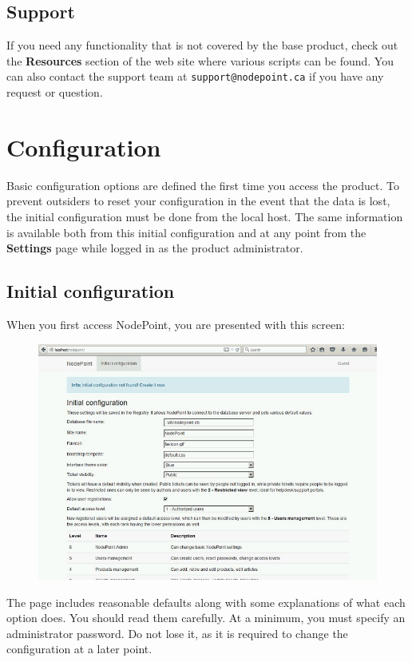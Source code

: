 \documentclass[11pt]{article}
\begin{document}
\subsection{Support}
If you need any functionality that is not covered by the base product, check out the \textbf{Resources} section of the web site where various scripts can be found. You can also contact the support team at \texttt{support@nodepoint.ca} if you have any request or question.

\clearpage
\section{Configuration}
Basic configuration options are defined the first time you access the product. To prevent outsiders to reset your configuration in the event that the data is lost, the initial configuration must be done from the local host. The same information is available both from this initial configuration and at any point from the \textbf{Settings} page while logged in as the product administrator.

\subsection{Initial configuration}
When you first access NodePoint, you are presented with this screen:

\begin{figure}[h]
\includegraphics{initial.jpg}
\end{figure}

The page includes reasonable defaults along with some explanations of what each option does. You should read them carefully. At a minimum, you must specify an administrator password. Do not lose it, as it is required to change the configuration at a later point.
\end{document}
